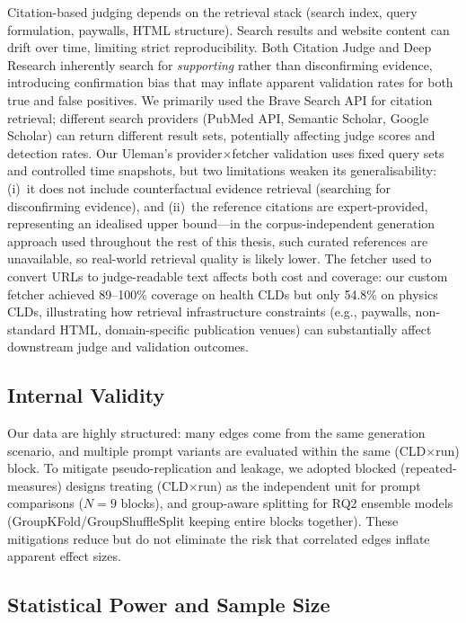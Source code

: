 Citation-based judging depends on the retrieval stack (search index, query formulation, paywalls, HTML structure). Search results and website content can drift over time, limiting strict reproducibility. Both Citation Judge and Deep Research inherently search for \emph{supporting} rather than disconfirming evidence, introducing confirmation bias that may inflate apparent validation rates for both true and false positives. We primarily used the Brave Search API for citation retrieval; different search providers (PubMed API, Semantic Scholar, Google Scholar) can return different result sets, potentially affecting judge scores and detection rates. Our Uleman's provider$\times$fetcher validation uses fixed query sets and controlled time snapshots, but two limitations weaken its generalisability: (i)~it does not include counterfactual evidence retrieval (searching for disconfirming evidence), and (ii)~the reference citations are expert-provided, representing an idealised upper bound---in the corpus-independent generation approach used throughout the rest of this thesis, such curated references are unavailable, so real-world retrieval quality is likely lower. The fetcher used to convert URLs to judge-readable text affects both cost and coverage: our custom fetcher achieved 89--100\% coverage on health CLDs but only 54.8\% on physics CLDs, illustrating how retrieval infrastructure constraints (e.g., paywalls, non-standard HTML, domain-specific publication venues) can substantially affect downstream judge and validation outcomes.

\subsection{Internal Validity}

Our data are highly structured: many edges come from the same generation scenario, and multiple prompt variants are evaluated within the same (CLD$\times$run) block. To mitigate pseudo-replication and leakage, we adopted blocked (repeated-measures) designs treating (CLD$\times$run) as the independent unit for prompt comparisons ($N=9$ blocks), and group-aware splitting for RQ2 ensemble models (GroupKFold/GroupShuffleSplit keeping entire blocks together). These mitigations reduce but do not eliminate the risk that correlated edges inflate apparent effect sizes.

\subsection{Statistical Power and Sample Size}

